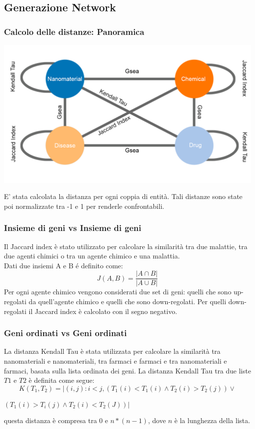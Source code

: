\documentclass{beamer}
\begin{document}
\subsection{Generazione Network}
\begin{frame}
\frametitle{Calcolo delle distanze: Panoramica}
\begin{center}
\includegraphics[scale=0.20]{img/Grafo.png}
\end{center}
E' stata calcolata la distanza per ogni coppia di entità. Tali distanze sono state poi normalizzate tra -1 e 1 per renderle confrontabili.
\end{frame}

\begin{frame}
\frametitle{Insieme di geni vs Insieme di geni}
Il Jaccard index è stato utilizzato per calcolare la similarità tra due malattie, tra due agenti chimici o tra un agente chimico e una malattia.\\
Dati due insiemi A e B \'e definito come:
\begin{equation} 
J(A, B) = \frac{|A \cap B|}{|A \cup  B|}
\end{equation}
Per ogni agente chimico vengono considerati due set di geni: quelli che sono up-regolati da quell'agente chimico e quelli che sono down-regolati.
Per quelli down-regolati il Jaccard index è calcolato con il segno negativo.
\end{frame}

\begin{frame}
\frametitle{Geni ordinati vs Geni ordinati}
La distanza Kendall Tau è stata utilizzata per calcolare la similarità tra nanomateriali e nanomateriali, tra farmaci e farmaci e tra nanomateriali e farmaci, basata sulla lista ordinata dei geni.
La distanza Kendall Tau tra due liste $T1$ e $T2$ è definita come segue:
\begin{equation}
K(T_1, T_2) = |(i, j): i < j, (T_1(i) < T_1(i) \wedge  T_2(i) > T_2(j)) \vee
\end{equation}
\begin{center}
	$ (T_1(i) > T_i(j) \wedge T_2(i) < T_2(J))  | $
\end{center}
questa distanza è compresa tra 0 e $n*(n -1)$, dove $n$ è la lunghezza della lista. 
\end{frame}
\end{document}
